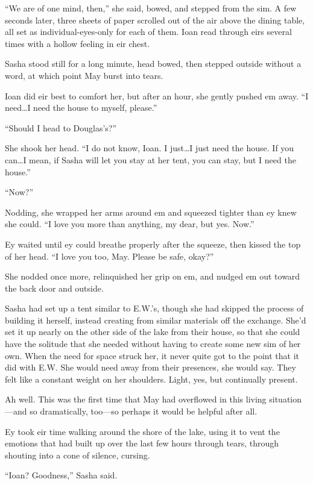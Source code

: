 ``We are of one mind, then,'' she said, bowed, and stepped from the sim. A few seconds later, three sheets of paper scrolled out of the air above the dining table, all set as individual-eyes-only for each of them. Ioan read through eirs several times with a hollow feeling in eir chest.

Sasha stood still for a long minute, head bowed, then stepped outside without a word, at which point May burst into tears.

Ioan did eir best to comfort her, but after an hour, she gently pushed em away. ``I need\ldots I need the house to myself, please.''

``Should I head to Douglas's?''

She shook her head. ``I do not know, Ioan. I just\ldots I just need the house. If you can\ldots I mean, if Sasha will let you stay at her tent, you can stay, but I need the house.''

``Now?''

Nodding, she wrapped her arms around em and squeezed tighter than ey knew she could. ``I love you more than anything, my dear, but yes. Now.''

Ey waited until ey could breathe properly after the squeeze, then kissed the top of her head. ``I love you too, May. Please be safe, okay?''

She nodded once more, relinquished her grip on em, and nudged em out toward the back door and outside.

Sasha had set up a tent similar to E.W.'s, though she had skipped the process of building it herself, instead creating from similar materials off the exchange. She'd set it up nearly on the other side of the lake from their house, so that she could have the solitude that she needed without having to create some new sim of her own. When the need for space struck her, it never quite got to the point that it did with E.W. She would need away from their presences, she would say. They felt like a constant weight on her shoulders. Light, yes, but continually present.

Ah well. This was the first time that May had overflowed in this living situation—and so dramatically, too—so perhaps it would be helpful after all.

Ey took eir time walking around the shore of the lake, using it to vent the emotions that had built up over the last few hours through tears, through shouting into a cone of silence, cursing.

``Ioan? Goodness,'' Sasha said.

